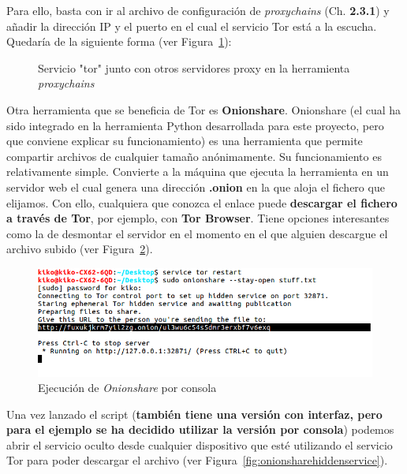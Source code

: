 Para  ello, basta con ir al archivo de configuración de \textit{proxychains} (Ch. \textbf{2.3.1}) y añadir la dirección IP y el puerto en el cual el servicio Tor está a la escucha. Quedaría de la siguiente forma (ver Figura~\ref{fig:pctor}):
\begin{figure}[H]
	\caption{Servicio "tor" junto con otros servidores proxy en la herramienta \textit{proxychains}}
	\label{fig:pctor}
\end{figure} 
Otra herramienta que se beneficia de Tor es \textbf{Onionshare}. 
Onionshare (el cual ha sido integrado en la herramienta Python desarrollada para este proyecto, pero que conviene explicar su funcionamiento) es una herramienta que permite compartir archivos de cualquier tamaño anónimamente. Su funcionamiento es relativamente simple. Convierte a la máquina que ejecuta la herramienta en un servidor web el cual genera una dirección \textbf{.onion} en la que aloja el fichero que elijamos. 
Con ello, cualquiera que conozca el enlace puede \textbf{descargar el fichero a través de Tor}, por ejemplo, con \textbf{Tor Browser}. 
Tiene opciones interesantes como la de desmontar el servidor en el momento en el que alguien descargue el archivo subido (ver Figura~\ref{fig:onionshare}).

\begin{figure}[H]
	\centerline{
		\mbox{\includegraphics[width=5.00in]{images/onionshare1.png}}
	}
	\caption{Ejecución de \textit{Onionshare} por consola}
	\label{fig:onionshare}
\end{figure} 

Una vez lanzado el script (\textbf{también tiene una versión con interfaz, pero para el ejemplo se ha decidido utilizar la versión por consola}) podemos abrir el servicio oculto desde cualquier dispositivo que esté utilizando el servicio Tor para poder descargar el archivo (ver Figura~\ref{fig:onionsharehiddenservice}).

